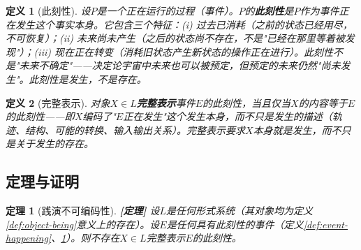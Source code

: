 \documentclass[11pt,a4paper]{article}
\newtheorem{definition}{定义}
\newtheorem{theorem}{定理}
\newcommand{\lvl}[1]{\hfill\textbf{\footnotesize[#1]}}
\newcommand{\lvP}{\lvl{定理}}
\begin{document}
\begin{definition}[此刻性]\label{def:nowness}
设$P$是一个正在运行的过程（事件）。$P$的\textbf{此刻性}是$P$\emph{作为事件正在发生}这个事实本身。它包含三个特征：(i) 过去已消耗（之前的状态已经用尽，不可恢复）；(ii) 未来尚未产生（之后的状态尚不存在，不是"已经在那里等着被发现"）；(iii) 现在正在转变（消耗旧状态产生新状态的操作正在进行）。此刻性不是"未来不确定"——决定论宇宙中未来也可以被预定，但预定的未来仍然"尚未发生"。此刻性是\emph{发生}，不是\emph{存在}。
\end{definition}

\begin{definition}[完整表示]\label{def:complete-representation}
对象$X\in L$\textbf{完整表示}事件$E$的此刻性，当且仅当$X$的内容等于$E$的此刻性——即$X$编码了"$E$正在发生"这个\emph{发生本身}，而不只是发生的描述（轨迹、结构、可能的转换、输入输出关系）。完整表示要求$X$本身就是发生，而不只是关于发生的存在。
\end{definition}

\subsection{定理与证明}

\begin{theorem}[践演不可编码性]\label{thm:performative-non-encodability}\lvP
设$L$是任何形式系统（其对象均为定义\ref{def:object-being}意义上的存在）。设$E$是任何具有此刻性的事件（定义\ref{def:event-happening}、\ref{def:nowness}）。则不存在$X\in L$完整表示$E$的此刻性。
\end{theorem}
\end{document}
